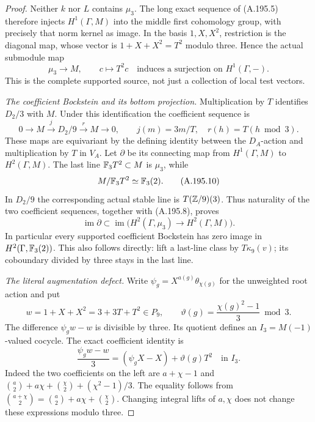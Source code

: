 \begin{proof}
Neither \(k\) nor \(L\) contains \(\mu_3\).  The long
exact sequence of (A.195.5) therefore injects \(H^1(\Gamma,M)\)
into the middle first cohomology group, with precisely that
norm kernel as image.  In the basis \(1,X,X^2\), restriction
is the diagonal map, whose vector is
\(1+X+X^2=T^2\) modulo three.  Hence the actual submodule
map
\[
 \mu_3\longrightarrow M,\qquad c\longmapsto T^2c
 \quad\text{induces a surjection on }H^1(\Gamma,-).
\tag{A.195.8}
\]
This is the complete supported source, not just a collection
of local test vectors.

\emph{The coefficient Bockstein and its bottom projection.}
Multiplication by \(T\) identifies \(D_2/3\) with \(M\).
Under this identification the coefficient sequence is
\[
 0\longrightarrow M\xrightarrow{\ j\ }D_2/9
       \xrightarrow{\ r\ }M\longrightarrow0,
 \qquad j(m)=3m/T,\quad r(h)=T(h\bmod3).
\tag{A.195.9}
\]
These maps are equivariant by the defining identity between
the \(D_A\)-action and multiplication by \(T\) in \(V_A\).
Let \(\partial\) be its connecting map from \(H^1(\Gamma,M)\)
to \(H^2(\Gamma,M)\).  The last line \(\mathbb F_3T^2\subset M\)
is \(\mu_3\), while
\[
                M/\mathbb F_3T^2\simeq\mathbb F_3(2).
\tag{A.195.10}
\]
In \(D_2/9\) the corresponding actual stable line is
\(T(\mathbb Z/9)(3)\).  Thus naturality of the two coefficient
sequences, together with (A.195.8), proves
\[
 \operatorname{im}\partial
       \subset\operatorname{im}
          \bigl(H^2(\Gamma,\mu_3)\to H^2(\Gamma,M)\bigr).
\tag{A.195.11}
\]
In particular every supported coefficient Bockstein has zero
image in \(H^2(\Gamma,\mathbb F_3(2))\).  This also follows directly:
lift a last-line class by \(T\kappa_9(v)\); its coboundary
divided by three stays in the last line.

\emph{The literal augmentation defect.}
Write \(\psi_g=X^{a(g)}\theta_{\chi(g)}\) for the
unweighted root action and put
\[
 w=1+X+X^2=3+3T+T^2\in P_9,
 \qquad \vartheta(g)=\frac{\chi(g)^2-1}{3}\bmod3.
\tag{A.195.12}
\]
The difference \(\psi_gw-w\) is divisible by three.
Its quotient defines an \(I_3=M(-1)\)-valued cocycle.
The exact coefficient identity is
\[
 \frac{\psi_gw-w}{3}
       =(\psi_gX-X)+\vartheta(g)T^2
                      \quad\text{in }I_3.
\tag{A.195.13}
\]
Indeed the two coefficients on the left are
\(a+\chi-1\) and
\(\binom a2+a\chi+\binom\chi2+(\chi^2-1)/3\).
The equality follows from
\(\binom{a+\chi}{2}=\binom a2+a\chi+\binom\chi2\).
Changing integral lifts of \(a,\chi\) does not change
these expressions modulo three.


\end{proof}
